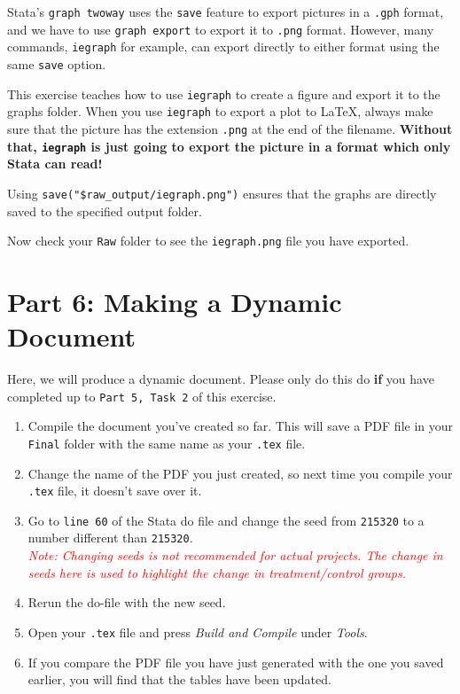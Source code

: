 \documentclass[]{article}
\begin{document}
Stata's \texttt{graph twoway} uses the \texttt{save} feature to export pictures in a \texttt{.gph} format, and we have to use \texttt{graph export} to export it to \texttt{.png} format. However, many commands, \texttt{iegraph} for example, can export directly to either format using the same \texttt{save} option. 

This exercise teaches how to use \texttt{iegraph} to create a figure and export it to the graphs folder. When you use \texttt{iegraph} to export a plot to {\LaTeX}, always make sure that the picture has the extension \texttt{.png} at the end of the filename. \textbf{Without that, \texttt{iegraph} is just going to export the picture in a format which only Stata can read!}

Using \verb|save("$raw_output/iegraph.png")| ensures that the graphs are directly saved to the specified output folder. 

Now check your \texttt{Raw} folder to see the \texttt{iegraph.png} file you have exported.

\section*{Part 6: Making a Dynamic Document }

Here, we will produce a dynamic document. Please only do this do \textbf{if} you have completed up to \texttt{Part 5, Task 2} of this exercise. 

\begin{enumerate}
	\item Compile the document you've created so far. This will save a PDF file in your \texttt{Final} folder with the same name as your \texttt{.tex} file.
	\item Change the name of the PDF you just created, so next time you compile your \texttt{.tex} file, it doesn't save over it.
	\item Go to \texttt{line 60} of the Stata do file and change the seed from \texttt{215320} to a number different than \texttt{215320}.\\ \textit{\textcolor{red}{Note: Changing seeds is not recommended for actual projects. The change in seeds here is used to highlight the change in treatment/control groups.}}
	\item Rerun the do-file with the new seed.
	\item Open your \texttt{.tex} file and press \textit{Build and Compile} under \textit{Tools}.
	\item If you compare the PDF file you have just generated with the one you saved earlier, you will find that the tables have been updated. 
\end{enumerate}
\end{document}
